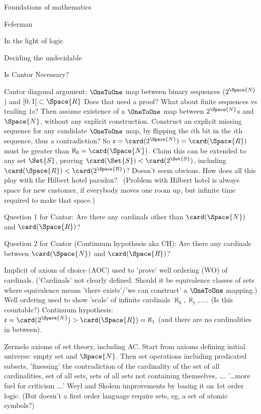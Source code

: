 \begin{plSection}{Foundations of mathematics}
\begin{plSection}{Feferman}
\begin{plSection}{In the light of logic}
\begin{plSection}{Deciding the undecidable}
\end{plSection}%
\begin{plSection}{Is Cantor Necessary?}
\label{sec:Is_Cantor_Necessary}

\cite{Feferman:1989:IsCantorNecessary}
\cite[ch.~2 ``Is Cantor necessary?'']{Feferman:1998:LightOfLogic}

Cantor diagonal argument:
\hfill\break
$\OneToOne$ map between binary sequences ($2^{\Space{N}}$)
and $[0,1]\subset\Space{R}$
Does that need a proof?
What about finite sequences vs trailing $1$s? 
\hfill\break
Then assume existence of a $\OneToOne$  
map between $2^{\Space{N}}$s 
and $\Space{N}$,
without any explicit construction.
Construct an explicit missing sequence 
for any candidate $\OneToOne$ map,
by flipping the $i$th bit in the $i$th sequence,
thus a contradiction?
So $\mathfrak{c} = \card(2^{\Space{N}}) 
= \card(\Space{R})$ must be greater than 
$\aleph_0 = \card(\Space{N})$. 
\hfill\break
Claim this can be extended to any set $\Set{S}$,
proving 
$\card(\Set{S}) < \card(2^{\Set{S}})$,
including 
$\card(\Space{R}) < \card(2^{\Space{R}})$?
Doesn't seem obvious.
\hfill\break
How does all this play with 
the Hilbert hotel paradox?~\cite{wiki:HilbertHotel}
(Problem with Hilbert hotel is 
always space for new customer, if everybody moves one room up,
but infinite time required to make that space.)

Question $1$ for Cantor:
\hfill\break
Are there any cardinals other than 
$\card(\Space{N})$ and 
$\card(\Space{R})$?

Question $2$ for Cantor (Continuum hypothesis aka CH):
\hfill\break
Are there any cardinals between
$\card(\Space{N})$ and 
$\card(\Space{R})$?

Implicit of axiom of choice (AOC) used to 'prove' 
well ordering (WO) of cardinals.
('Cardinals' not clearly defined.
Should it be equivalence classes of sets where
equivalence means 'there exists'/'we can construct'
a $\OneToOne$ mapping.)
\hfill\break
Well ordering used to show 'scale' of infinite cardinals
$\aleph_0, \aleph_1, \ldots$. (Is this countable?)
\hfill\break
Continuum hypothesis: 
$\mathfrak{c} = \card(2^{\Space{N}}) 
> \card(\Space{R}) = \aleph_1$
(and there are no cardinalities in between).

Zermelo axioms of set theory, including AC.
Start from axioms defining initial universe:
empty set and $\Space{N}$.
Then set operations including predicated subsets,
'finessing' the contradiction of the
cardinality of the set of all cardinalities,
set of all sets,
sets of all sets not containing themselves, 
\ldots.
\hfill\break
'\ldots more fuel for criticism \ldots.'
Weyl and Skolem improvements by basing it on 1st order logic.
(But doesn't a first order language require sets,
eg, a set of atomic symbols?)


\end{plSection}
\end{plSection}
\end{plSection}
\end{plSection}
